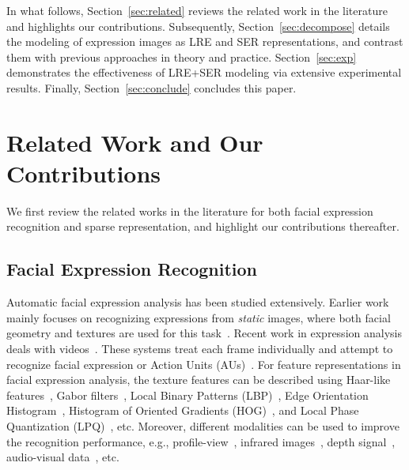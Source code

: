 \documentclass[journal]{IEEEtran}
\begin{document}
In what follows, Section~\ref{sec:related} reviews the related work in the literature and highlights our contributions. Subsequently, Section~\ref{sec:decompose} details the modeling of expression images as LRE and SER representations, and contrast them with previous approaches in theory and practice. Section~\ref{sec:exp} demonstrates the effectiveness of LRE+SER modeling via extensive experimental results. Finally, Section~\ref{sec:conclude} concludes this paper.



\section{Related Work and Our Contributions\label{sec:related}}

We first review the related works in the literature for both facial expression recognition and sparse representation, and highlight our contributions thereafter. 

\subsection{Facial Expression Recognition}

Automatic facial expression analysis has been studied extensively. Earlier work mainly focuses on recognizing expressions from \textit{static} images, where both facial geometry and textures are used for this task~\cite{Pantic_PAMI00,Essa_PAMI97,Donato_PAMI99}. Recent work in expression analysis deals with videos~\cite{Zafeiriou_TMM08,Bartlett_FG11,Kaliouby_SMC04,Valstar_FERA11}. These systems treat each frame individually and attempt to recognize facial expression or Action Units (AUs)~\cite{Ekman78}. For feature representations in facial expression analysis, the texture features can be described using Haar-like features~\cite{Whitehill_FG06}, Gabor filters~\cite{Lyons_PAMI99,Bartlett_FG11}, Local Binary Patterns (LBP)~\cite{Shan_IVC09,Jiang_FG11}, Edge Orientation Histogram~\cite{Levi_CVPR04}, Histogram of Oriented Gradients (HOG)~\cite{Dalal_CVPR05,Dhall_FERA11,Dahmane_FERA11}, and Local Phase Quantization (LPQ)~\cite{LPQ}, etc. Moreover, different modalities can be used to improve the recognition performance, e.g., profile-view~\cite{Huang_TMM10}, infrared images~\cite{Wang_TMM10}, depth signal~\cite{Fanelli_TMM10}, audio-visual data~\cite{Fanelli_TMM10,Tawari_TMM13,Mao_TMM14}, etc.
\end{document}
